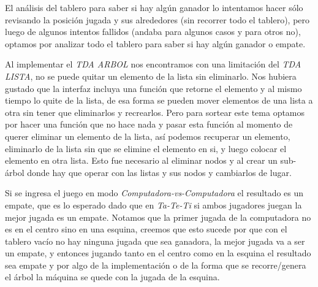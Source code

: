 \documentclass[12pt,a4paper]{article}
\begin{document}
El an\'alisis del tablero para saber si hay alg\'un ganador lo intentamos hacer s\'olo revisando la posici\'on jugada y sus alrededores (sin recorrer todo el tablero), pero luego de algunos intentos fallidos (andaba para algunos casos y para otros no), optamos por analizar todo el tablero para saber si hay alg\'un ganador o empate.

Al implementar el \emph{TDA ARBOL} nos encontramos con una limitaci\'on del \emph{TDA LISTA}, no se puede quitar un elemento de la lista sin eliminarlo. Nos hubiera gustado que la interfaz incluya una funci\'on que retorne el elemento y al mismo tiempo lo quite de la lista, de esa forma se pueden mover elementos de una lista a otra sin tener que eliminarlos y recrearlos. Pero para sortear este tema optamos por hacer una funci\'on que no hace nada y pasar esta funci\'on al momento de querer eliminar un elemento de la lista, as\'i podemos recuperar un elemento, eliminarlo de la lista sin que se elimine el elemento en si, y luego colocar el elemento en otra lista. Esto fue necesario al eliminar nodos y al crear un sub-\'arbol donde hay que operar con las listas y sus nodos y cambiarlos de lugar.

Si se ingresa el juego en modo \emph{Computadora-vs-Computadora} el resultado es un empate, que es lo esperado dado que en \emph{Ta-Te-Ti} si ambos jugadores juegan la mejor jugada es un empate. Notamos que la primer jugada de la computadora no es en el centro sino en una esquina, creemos que esto sucede por que con el tablero vac\'io no hay ninguna jugada que sea ganadora, la mejor jugada va a ser un empate, y entonces jugando tanto en el centro como en la esquina el resultado sea empate y por algo de la implementaci\'on o de la forma que se recorre/genera el \'arbol la m\'aquina se quede con la jugada de la esquina.
\end{document}
